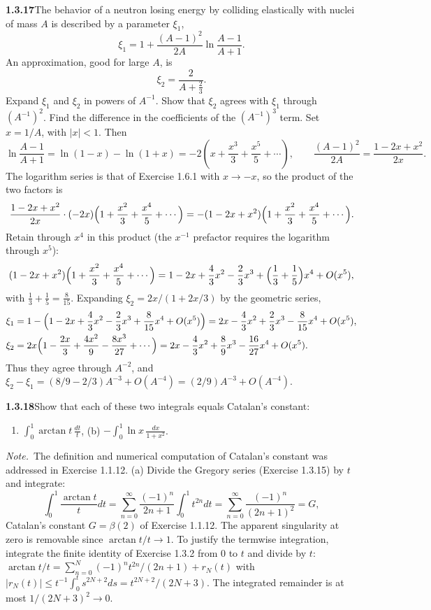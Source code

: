 \par\bigskip
\noindent\textbf{1.3.17}\quad The behavior of a neutron losing energy by
colliding elastically with nuclei of mass $A$ is described by a parameter
$\xi_{1}$,
\[
\xi_{1}=1+\frac{(A-1)^{2}}{2A}\ln\frac{A-1}{A+1}.
\]
An approximation, good for large $A$, is
\[
\xi_{2}=\frac{2}{A+\frac{2}{3}}.
\]
Expand $\xi_{1}$ and $\xi_{2}$ in powers of $A^{-1}$. Show that $\xi_{2}$
agrees with $\xi_{1}$ through $(A^{-1})^{2}$. Find the difference in the
coefficients of the $(A^{-1})^{3}$ term.
\solution
Set $x=1/A$, with $|x|<1$. Then
\[
 \ln\frac{A-1}{A+1}=\ln(1-x)-\ln(1+x)
 =-2\left(x+\frac{x^3}3+\frac{x^5}5+\cdots\right),
 \qquad \frac{(A-1)^2}{2A}=\frac{1-2x+x^2}{2x}.
\]
The logarithm series is that of Exercise 1.6.1 with $x\to-x$, so the
product of the two factors is
\[
 \frac{1-2x+x^2}{2x}\cdot(-2x)\Bigl(1+\frac{x^2}3+\frac{x^4}5+\cdots\Bigr)
 =-(1-2x+x^2)\Bigl(1+\frac{x^2}3+\frac{x^4}5+\cdots\Bigr).
\]
Retain through $x^4$ in this product (the $x^{-1}$ prefactor requires
the logarithm through $x^5$):
\[
 (1-2x+x^2)\Bigl(1+\frac{x^2}3+\frac{x^4}5+\cdots\Bigr)
 =1-2x+\frac43x^2-\frac23x^3+\Bigl(\frac13+\frac15\Bigr)x^4+O(x^5),
\]
with $\frac13+\frac15=\frac8{15}$. Expanding $\xi_2=2x/(1+2x/3)$ by
the geometric series,
\[
 \begin{aligned}
 \xi_1&=1-\Bigl(1-2x+\frac43x^2-\frac23x^3+\frac8{15}x^4+O(x^5)\Bigr)
 =2x-\frac43x^2+\frac23x^3-\frac8{15}x^4+O(x^5),\\
 \xi_2&=2x\Bigl(1-\frac{2x}3+\frac{4x^2}9-\frac{8x^3}{27}+\cdots\Bigr)
       =2x-\frac43x^2+\frac89x^3-\frac{16}{27}x^4+O(x^5).
 \end{aligned}
\]
Thus they agree through $A^{-2}$, and
$\xi_2-\xi_1=(8/9-2/3)A^{-3}+O(A^{-4})
=\boxed{(2/9)A^{-3}+O(A^{-4})}$.


\par\bigskip
\noindent\textbf{1.3.18}\quad Show that each of these two integrals equals
Catalan's constant:
\begin{enumerate}
\item[(a)] $\displaystyle\int_{0}^{1}\arctan t\,\frac{dt}{t}$,\qquad
(b) $\displaystyle-\int_{0}^{1}\ln x\,\frac{dx}{1+x^{2}}$.
\end{enumerate}

\emph{Note.}~The definition and numerical computation of Catalan's constant
was addressed in Exercise 1.1.12.
\solution
(a) Divide the Gregory series (Exercise 1.3.15) by $t$ and integrate:
\[
 \int_0^1\frac{\arctan t}{t}dt
 =\sum_{n=0}^\infty\frac{(-1)^n}{2n+1}\int_0^1t^{2n}dt
 =\sum_{n=0}^\infty\frac{(-1)^n}{(2n+1)^2}=G,
\]
Catalan's constant $G=\beta(2)$ of Exercise 1.1.12.
The apparent singularity at zero is removable since $\arctan t/t\to1$.
To justify the termwise integration, integrate the finite identity of
Exercise 1.3.2 from $0$ to $t$ and divide by $t$:
$\arctan t/t=\sum_{n=0}^N(-1)^nt^{2n}/(2n+1)+r_N(t)$ with
$|r_N(t)|\le t^{-1}\int_0^ts^{2N+2}ds=t^{2N+2}/(2N+3)$. The integrated
remainder is at most $1/(2N+3)^2\to0$.

